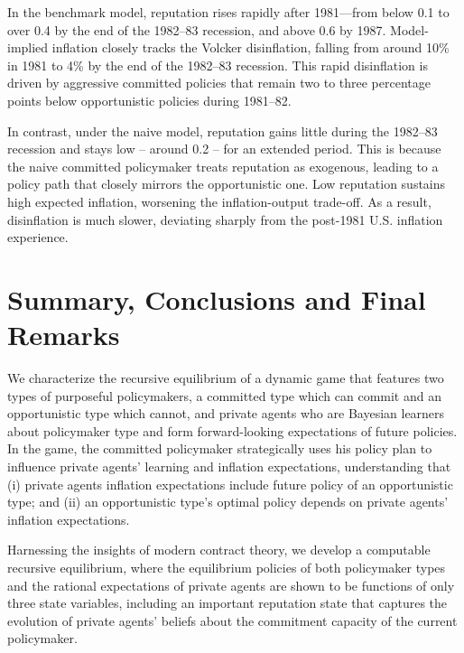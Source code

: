 \documentclass[12pt,letter,leqno]{article}
\theoremstyle{asn}
\theoremstyle{lem}
\theoremstyle{slem}
\theoremstyle{prop}
\theoremstyle{appprop}
\theoremstyle{rem}
\theoremstyle{defn}
\begin{document}
In the benchmark model, reputation rises rapidly after 1981—from below 0.1 to over 0.4 by the end of the 1982–83 recession, and above 0.6 by 1987. Model-implied inflation closely tracks the Volcker disinflation, falling from around 10\% in 1981 to 4\% by the end of the 1982–83 recession. This rapid disinflation is driven by aggressive committed policies that remain two to three percentage points below opportunistic policies during 1981–82.

In contrast, under the naive model, reputation gains little during the 1982–83 recession and stays low -- around 0.2 -- for an extended period. This is because the naive committed policymaker treats reputation as exogenous, leading to a policy path that closely mirrors the opportunistic one. Low reputation sustains high expected inflation, worsening the inflation-output trade-off. As a result, disinflation is much slower, deviating sharply from the post-1981 U.S. inflation experience.







\section{Summary, Conclusions and Final Remarks}
We characterize the recursive equilibrium of a dynamic game that features two types of purposeful policymakers, a committed type which can commit and an opportunistic type which cannot, and private agents who are Bayesian learners about policymaker type and form forward-looking expectations of future policies. In the game, the committed policymaker strategically uses his policy plan to influence private agents' learning and inflation expectations, understanding that (i) private agents inflation expectations include future policy of an opportunistic type; and (ii) an opportunistic type’s optimal policy depends on private agents' inflation expectations. 

Harnessing the insights of modern contract theory, we develop a computable recursive equilibrium, where the equilibrium policies of both policymaker types and the rational expectations of private agents are shown to be functions of only three state variables, including an important reputation state that captures the evolution of private agents' beliefs about the commitment capacity of the current policymaker. 
 
\end{document}
